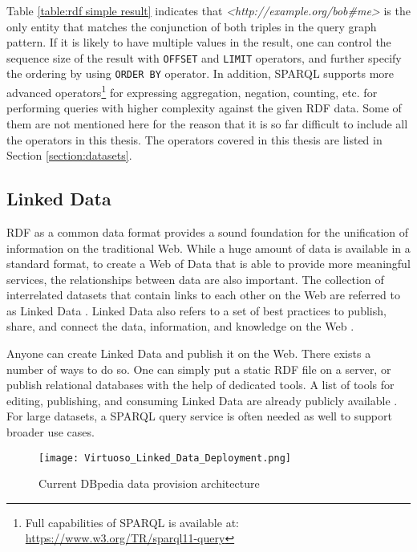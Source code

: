 Table \ref{table:rdf simple result} indicates that \textit{<http://example.org/bob\#me>} is the only entity that matches the conjunction of both triples in the query graph pattern. If it is likely to have multiple values in the result, one can control the sequence size of the result with \texttt{OFFSET} and \texttt{LIMIT} operators, and further specify the ordering by using \texttt{ORDER BY} operator. In addition, SPARQL supports more advanced operators\footnote{Full capabilities of SPARQL is available at: \url{https://www.w3.org/TR/sparql11-query}} for expressing aggregation, negation, counting, etc. for performing queries with higher complexity against the given RDF data. Some of them are not mentioned here for the reason that it is so far difficult to include all the operators in this thesis. The operators covered in this thesis are listed in Section \ref{section:datasets}.  

\subsection{Linked Data} \label{subsection:linked data}
RDF as a common data format provides a sound foundation for the unification of information on the traditional Web. While a huge amount of data is available in a standard format, to create a Web of Data that is able to provide more meaningful services, the relationships between data are also important. The collection of interrelated datasets that contain links to each other on the Web are referred to as Linked Data \cite{linkeddataw3c}. Linked Data also refers to a set of best practices to publish, share, and connect the data, information, and knowledge on the Web \cite{Bizer2009}. 

Anyone can create Linked Data and publish it on the Web. There exists a number of ways to do so. One can simply put a static RDF file on a server, or publish relational databases with the help of dedicated tools. A list of tools for editing, publishing, and consuming Linked Data are already publicly available \cite{ldtools}. For large datasets, a SPARQL query service is often needed as well to support broader use cases.

\begin{figure}[h]
\texttt{[image: Virtuoso\_Linked\_Data\_Deployment.png]} 
\centering
\caption{Current DBpedia data provision architecture \cite{dbparchi} }
\label{figure:dbpedia architecture}
\end{figure}

